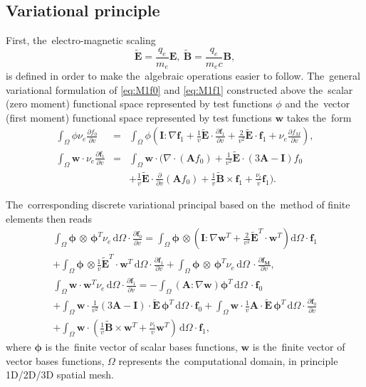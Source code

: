 \documentclass[review]{elsarticle}
\newcommand{\pdv}[2]{\frac{\partial{#1}}{\partial{#2}}}
\newcommand{\vect}[1]{\boldsymbol{#1}}
\newcommand{\matr}[1]{\mathbf{#1}}
\newcommand{\dI}{\text{d}}
\newcommand{\nue}{\nu_{e}}
\newcommand{\nutot}{\nu_{t}}
\newcommand{\vmag}{v}
\newcommand{\E}{\vect{E}}
\newcommand{\B}{\vect{B}}
\newcommand{\tE}{\vect{\tilde{E}}}
\newcommand{\tB}{\vect{\tilde{B}}}
\newcommand{\qe}{q_e}
\newcommand{\me}{m_e}
\newcommand{\fM}{f_M}
\newcommand{\fzero}{f_0}
\newcommand{\vfzero}{\vect{f}_0}
\newcommand{\fone}{\vect{f}_1}
\newcommand{\MI}{\matr{I}}
\newcommand{\MA}{\matr{A}}
\newcommand{\intO}{\int_{\Omega}}
\begin{document}
\subsection{Variational principle}
First, the~electro-magnetic scaling
\begin{equation}
  \tE = \frac{\qe}{\me}\E,~\tB = \frac{\qe}{\me c} \B,
\end{equation}
is defined in order to make the~algebraic operations easier to follow.
The~general variational formulation of \eqref{eq:M1f0} and \eqref{eq:M1f1} 
constructed above the~scalar (zero moment) functional space
represented by test functions $\phi$ and the~vector
(first moment) functional space represented by test functions $\vect{w}$ 
takes the~form
\begin{eqnarray}
  \intO\phi\nue\pdv{\fzero}{\vmag} &=& 
  \intO\phi
  \left(\MI:\nabla\fone + 
  \frac{1}{\vmag}\tE\cdot\pdv{\fone}{\vmag}
  + \frac{2}{\vmag^2}\tE\cdot\fone + \nue \pdv{\fM}{\vmag}\right) , 
  \label{eq:M1hosf0_variational}\\
  \intO\vect{w}\cdot\nue\pdv{\fone}{\vmag} &=&
  \intO\vect{w}\cdot\Bigg(\nabla\cdot\left(\MA\fzero\right)  
  + \frac{1}{\vmag^2}\tE\cdot\left( 3\MA - \MI \right)\fzero
  \nonumber\\
  && 
  + \frac{1}{\vmag}\tE\cdot\pdv{}{\vmag}
  \left( \MA\fzero\right) + \frac{1}{\vmag}\tB\times\fone + 
  \frac{\nutot}{\vmag}\fone\Bigg) .
  \label{eq:M1hosf1_variational}
\end{eqnarray}

The~corresponding discrete variational principal based on the~method of 
finite elements then reads
\begin{multline}
  \intO\vect{\phi}\, \otimes\, \vect{\phi}^T 
  \nue\, \dI \Omega \cdot \pdv{\vfzero}{\vmag} = 
  \intO\vect{\phi}\, \otimes \left(\MI:\nabla\matr{w}^T + 
  \frac{2}{\vmag^2}\tE^T \cdot\matr{w}^T \right)\dI \Omega
  \cdot \fone \\
  + \intO\vect{\phi}\, \otimes
  \frac{1}{\vmag}\tE^T \cdot \matr{w}^T\, \dI \Omega 
  \cdot \pdv{\fone}{\vmag} + 
  \intO\vect{\phi}\, \otimes\, \vect{\phi}^T \nue\, \dI\Omega\,
  \cdot \pdv{\vect{\fM}}{\vmag} , 
  \label{eq:FEM1hosf0}
\end{multline}
\begin{multline}
  \intO\matr{w} \cdot \matr{w}^T \nue\, \dI\Omega \cdot 
  \pdv{\fone}{\vmag} =
  - \intO
  \left(\MA : \nabla\matr{w}\right)
  \vect{\phi}^T\, \dI \Omega\, 
  \cdot \vfzero \\
  + \intO\matr{w} \cdot 
  \frac{1}{\vmag^2} \left( 3\MA - \MI \right) \cdot \tE\,  
  \vect{\phi}^T\, \dI\Omega \cdot \vfzero 
  + \intO\matr{w} \cdot
  \frac{1}{\vmag} \MA \cdot \tE\, \vect{\phi}^T\, \dI \Omega 
  \cdot \pdv{\vfzero}{\vmag}\\
  + \intO\matr{w} \cdot
  \left(\frac{1}{\vmag}\tilde{\B}\times\matr{w}^T + 
  \frac{\nutot}{\vmag} \matr{w}^T\right)\, \dI\Omega 
  \cdot \fone ,
  \label{eq:FEM1hosf1}
\end{multline}
where $\vect{\phi}$ is the~finite vector of scalar bases functions, 
$\matr{w}$ is the~finite vector of vector bases functions,
$\Omega$ represents the~computational domain, in principle 1D/2D/3D 
spatial mesh. 
\end{document}
